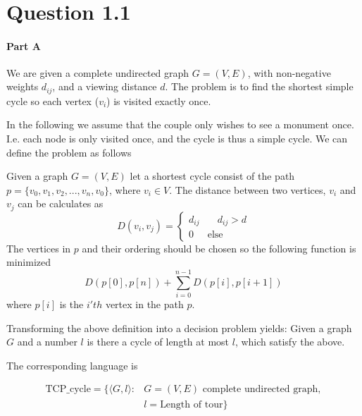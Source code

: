 \documentclass[10pt]{article}
\author{\authorName \\\texttt{\small{\authorEmail}}}
\title{\textsc{\titleName \\ \courseName}}
\begin{document}
\maketitle    

\section*{Question 1.1} %
\label{sec:question_1_1}
\paragraph{Part A} %
\label{par:part_a}

We are given a complete undirected graph $G = (V,E)$, with non-negative weights $d_{ij}$, and a viewing distance $d$. The problem is to find the shortest simple cycle so each vertex ($v_i$) is visited exactly once.

In the following we assume that the couple only wishes to see a monument once. I.e. each node is only visited once, and the cycle is thus a simple cycle. We can define the problem as follows

\begin{mydef}
Given a graph $G = (V, E)$ let a shortest cycle consist of the path $p = \{v_0, v_1,v_2,...,v_n, v_0\}$, where $v_i \in V$. The distance between two vertices, $v_i$ and $v_j$ can be calculates as
\begin{equation} 
D(v_i,v_j) = 
\left\{
\begin{array}{lr} 
 d_{ij} &  \quad d_{ij}>d \\
 0      &  \text{else}
\end{array} 
\right. 
\end{equation} 
The vertices in $p$ and their ordering should be chosen so the following function is minimized
\begin{equation}
  D(p[0],p[n])+\sum_{i=0}^{n-1} D(p[i],p[i+1])
\end{equation}
where $p[i]$ is the $i'th$ vertex in the path $p$.
\label{def1}
\end{mydef}

Transforming the above definition into a decision problem yields: Given a graph $G$ and a number $l$ is there a cycle of length at most $l$, which satisfy the above.

The corresponding language is

\begin{align*}
   \text{TCP_cycle} = \{ \langle G, l \rangle : &G = (V,E) \text{ complete undirected graph},\\ 
                                               &l = \text{Length of tour}  \}
\end{align*}
\end{document}
